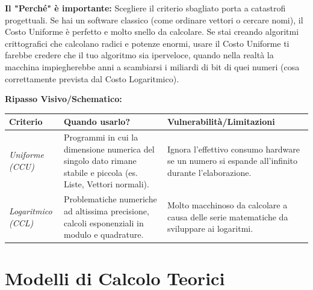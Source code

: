 \documentclass[a4paper, 11pt]{report}
\begin{document}
\textbf{Il "Perché" è importante:}
Scegliere il criterio sbagliato porta a catastrofi progettuali. Se hai un software classico (come ordinare vettori o cercare nomi), il Costo Uniforme è perfetto e molto snello da calcolare. Se stai creando algoritmi crittografici che calcolano radici e potenze enormi, usare il Costo Uniforme ti farebbe credere che il tuo algoritmo sia iperveloce, quando nella realtà la macchina impiegherebbe anni a scambiarsi i miliardi di bit di quei numeri (cosa correttamente prevista dal Costo Logaritmico).

\textbf{Ripasso Visivo/Schematico:}
\begin{center}
\begin{tabular}{|p{3cm}|p{6cm}|p{6cm}|}
\hline
\textbf{Criterio} & \textbf{Quando usarlo?} & \textbf{Vulnerabilità/Limitazioni} \\
\hline
\textit{Uniforme (CCU)} & Programmi in cui la dimensione numerica del singolo dato rimane stabile e piccola (es. Liste, Vettori normali). & Ignora l'effettivo consumo hardware se un numero si espande all'infinito durante l'elaborazione. \\
\hline
\textit{Logaritmico (CCL)} & Problematiche numeriche ad altissima precisione, calcoli esponenziali in modulo e quadrature. & Molto macchinoso da calcolare a causa delle serie matematiche da sviluppare ai logaritmi. \\
\hline
\end{tabular}
\end{center}
\chapter{Modelli di Calcolo Teorici}
\end{document}
